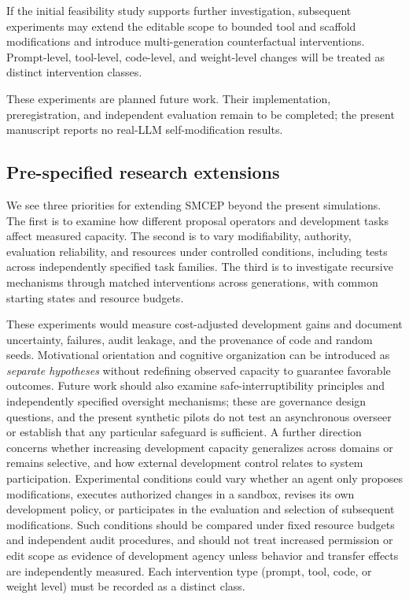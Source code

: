 \documentclass[11pt,a4paper]{article}
\begin{document}
If the initial feasibility study supports further investigation, subsequent experiments may extend
the editable scope to bounded tool and scaffold modifications and introduce multi-generation counterfactual interventions. Prompt-level, tool-level, code-level, and weight-level changes
will be treated as distinct intervention classes.

These experiments are planned future work. Their implementation, preregistration, and independent evaluation remain to be completed; the present manuscript reports no real-LLM self-modification results.

\subsection{Pre-specified research extensions}
We see three priorities for extending SMCEP beyond the present simulations. The first is to examine
how different proposal operators and development tasks affect measured capacity. The second is to
vary modifiability, authority, evaluation reliability, and resources under controlled conditions, including tests across independently specified task families. The third is to investigate recursive mechanisms through matched interventions across generations, with common starting states and resource budgets.

These experiments would measure cost-adjusted development gains and document uncertainty, failures, audit leakage, and the provenance of
code and random seeds. Motivational orientation and cognitive organization can be introduced as \emph{separate hypotheses} without redefining observed capacity to guarantee favorable outcomes. Future work should also examine safe-interruptibility principles \cite{orseau2016} and independently specified oversight mechanisms; these are governance design questions, and the present synthetic pilots do not test an asynchronous overseer or establish that any particular safeguard is sufficient. A further direction concerns whether increasing development capacity generalizes across domains or remains selective, and how external development control relates to system participation. Experimental conditions could vary whether an agent only proposes modifications, executes authorized changes in a sandbox, revises its own development policy, or participates in the evaluation and selection of subsequent modifications. Such conditions should be compared under fixed resource budgets and independent audit procedures, and should not treat increased permission or edit scope as evidence of development agency unless behavior and transfer effects are independently measured. Each intervention type (prompt, tool, code, or weight level) must be recorded as a distinct class.
\end{document}
